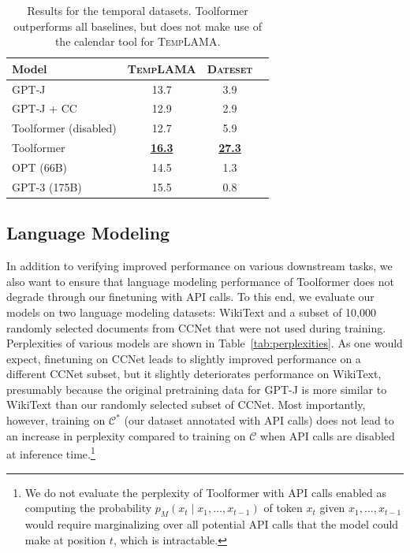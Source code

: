 \documentclass[11pt]{article}
\newcommand{\ours}[0]{Toolformer}
\begin{document}
\begin{CJK*}{UTF8}{gbsn}
\begin{table}
    \centering
    \small
    \begin{tabularx}{\linewidth}{Xccc}
        \toprule
        \textbf{Model} & \textbf{\textsc{TempLAMA}} & \textbf{\textsc{Dateset}}\\
        \midrule
         GPT-J & 13.7 & \phantom{0}3.9 \\         
         GPT-J + CC  & 12.9 & \phantom{0}2.9   \\        
         \ours{} (disabled)  & 12.7 & \phantom{0}5.9 \\
         \ours{} & \textbf{\underline{16.3}} & \textbf{\underline{27.3}} \\
         \midrule  
         OPT (66B) & 14.5 & \phantom{0}1.3 \\
         GPT-3 (175B) & 15.5 & \phantom{0}0.8 \\
         \bottomrule
    \end{tabularx}
    \caption{Results for the temporal datasets. \ours{} outperforms all baselines, but does not make use of the calendar tool for \textsc{TempLAMA}.}
    \label{tab:temporal_results}
\end{table}

\subsection{Language Modeling} 
\label{section:language-modeling}

In addition to verifying improved performance on various downstream tasks, we also want to ensure that language modeling performance of \ours{} does not degrade through our finetuning with API calls. To this end, we evaluate our models on two language modeling datasets: WikiText \citep{merity2017pointer} and a subset of 10,000 randomly selected documents from CCNet \citep{wenzek-etal-2020-ccnet} that were not used during training. Perplexities of various models are shown in Table~\ref{tab:perplexities}. As one would expect, finetuning on CCNet leads to slightly improved performance on a different CCNet subset, but it slightly deteriorates performance on WikiText, presumably because the original pretraining data for GPT-J is more similar to WikiText than our randomly selected subset of CCNet. Most importantly, however, training on $\mathcal{C}^*$ (our dataset annotated with API calls) does not lead to an increase in perplexity compared to training on $\mathcal{C}$ when API calls are disabled at inference time.\footnote{We do not evaluate the perplexity of \ours{} with API calls enabled as computing the probability $p_M(x_t \mid x_1, \ldots, x_{t-1})$ of token $x_t$ given $x_1, \ldots, x_{t-1}$ would require marginalizing over all potential API calls that the model could make at position $t$, which is intractable.}


\end{CJK*}
\end{document}
